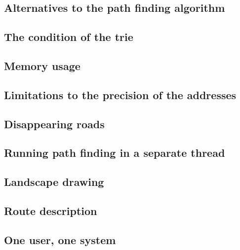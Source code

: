 \documentclass[a4paper,11pt]{article}
\begin{document}
\subsection{Alternatives to the path finding algorithm}


\subsection{The condition of the trie}


\subsection{Memory usage}


\subsection{Limitations to the precision of the addresses}


\subsection{Disappearing roads}


\subsection{Running path finding in a separate thread}


\subsection{Landscape drawing}


\subsection{Route description}


\subsection{One user, one system}

\end{document}
